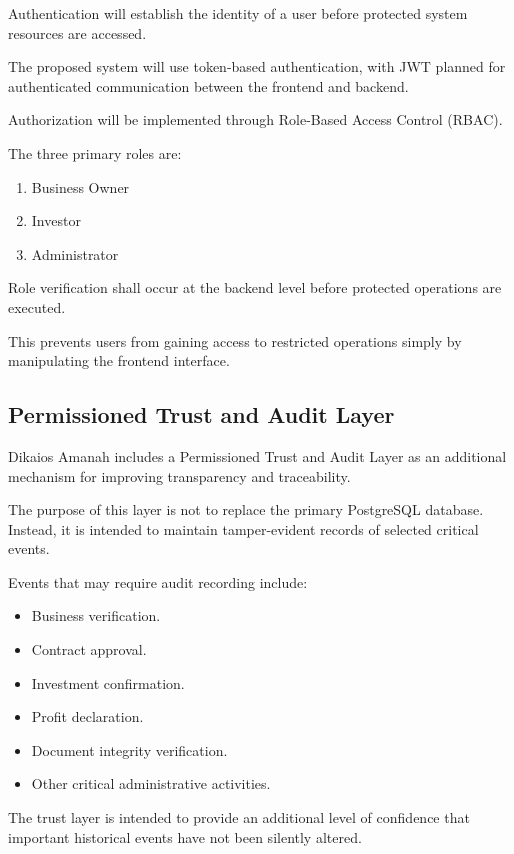 Authentication will establish the identity of a user before protected
system resources are accessed.

The proposed system will use token-based authentication, with JWT planned
for authenticated communication between the frontend and backend.

Authorization will be implemented through Role-Based Access Control
(RBAC).

The three primary roles are:

\begin{enumerate}
    \item Business Owner
    \item Investor
    \item Administrator
\end{enumerate}

Role verification shall occur at the backend level before protected
operations are executed.

This prevents users from gaining access to restricted operations simply
by manipulating the frontend interface.


\subsection{Permissioned Trust and Audit Layer}

Dikaios Amanah includes a Permissioned Trust and Audit Layer as an
additional mechanism for improving transparency and traceability.

The purpose of this layer is not to replace the primary PostgreSQL
database. Instead, it is intended to maintain tamper-evident records of
selected critical events.

Events that may require audit recording include:

\begin{itemize}
    \item Business verification.
    \item Contract approval.
    \item Investment confirmation.
    \item Profit declaration.
    \item Document integrity verification.
    \item Other critical administrative activities.
\end{itemize}

The trust layer is intended to provide an additional level of confidence
that important historical events have not been silently altered.

